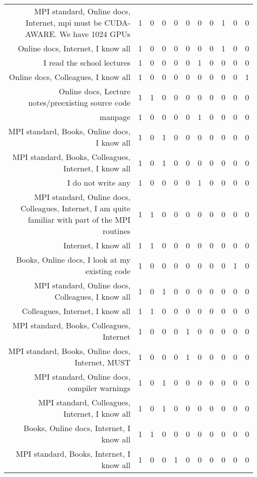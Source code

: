{\begin{landscape}
\begin{longtable}[htb]{r|c|c|c|c|c|c|c|c|c|c}
{MPI standard, Online docs, Internet, mpi must be CUDA-AWARE. We have 1024 GPUs} & 1 & 0 & 0 & 0 & 0 & 0 & 0 & 1 & 0 & 0 \\%
{Online docs, Internet, I know all} & 1 & 0 & 0 & 0 & 0 & 0 & 0 & 1 & 0 & 0 \\%
{I read the school lectures} & 1 & 0 & 0 & 0 & 0 & 1 & 0 & 0 & 0 & 0 \\%
{Online docs, Colleagues, I know all} & 1 & 0 & 0 & 0 & 0 & 0 & 0 & 0 & 0 & 1 \\%
{Online docs, Lecture notes/preexisting source code} & 1 & 1 & 0 & 0 & 0 & 0 & 0 & 0 & 0 & 0 \\%
{manpage} & 1 & 0 & 0 & 0 & 0 & 1 & 0 & 0 & 0 & 0 \\%
{MPI standard, Books, Online docs, I know all} & 1 & 0 & 1 & 0 & 0 & 0 & 0 & 0 & 0 & 0 \\%
{MPI standard, Books, Colleagues, Internet, I know all} & 1 & 0 & 1 & 0 & 0 & 0 & 0 & 0 & 0 & 0 \\%
{I do not write any} & 1 & 0 & 0 & 0 & 0 & 1 & 0 & 0 & 0 & 0 \\%
{MPI standard, Online docs, Colleagues, Internet, I am quite familiar with part of the MPI routines} & 1 & 1 & 0 & 0 & 0 & 0 & 0 & 0 & 0 & 0 \\%
{Internet, I know all} & 1 & 1 & 0 & 0 & 0 & 0 & 0 & 0 & 0 & 0 \\%
{Books, Online docs, I look at my existing code} & 1 & 0 & 0 & 0 & 0 & 0 & 0 & 0 & 1 & 0 \\%
{MPI standard, Online docs, Colleagues, I know all} & 1 & 0 & 1 & 0 & 0 & 0 & 0 & 0 & 0 & 0 \\%
{Colleagues, Internet, I know all} & 1 & 1 & 0 & 0 & 0 & 0 & 0 & 0 & 0 & 0 \\%
{MPI standard, Books, Colleagues, Internet} & 1 & 0 & 0 & 0 & 1 & 0 & 0 & 0 & 0 & 0 \\%
{MPI standard, Books, Online docs, Internet, MUST} & 1 & 0 & 0 & 0 & 1 & 0 & 0 & 0 & 0 & 0 \\%
{MPI standard, Online docs, compiler warnings} & 1 & 0 & 1 & 0 & 0 & 0 & 0 & 0 & 0 & 0 \\%
{MPI standard, Colleagues, Internet, I know all} & 1 & 0 & 1 & 0 & 0 & 0 & 0 & 0 & 0 & 0 \\%
{Books, Online docs, Internet, I know all} & 1 & 1 & 0 & 0 & 0 & 0 & 0 & 0 & 0 & 0 \\%
{MPI standard, Books, Internet, I know all} & 1 & 0 & 0 & 1 & 0 & 0 & 0 & 0 & 0 & 0 \\%
\hline%
\end{longtable}%
\end{landscape}}%
\clearpage%

